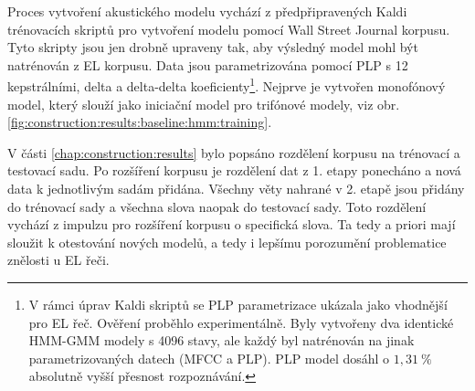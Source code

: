 
Proces vytvoření akustického modelu vychází z předpřipravených Kaldi trénovacích skriptů pro vytvoření modelu pomocí Wall Street Journal korpusu.
Tyto skripty jsou jen drobně upraveny tak, aby výsledný model mohl být natrénován z EL korpusu. Data jsou parametrizována pomocí PLP s 12 kepstrálními, delta a delta-delta koeficienty\footnote{V rámci úprav Kaldi skriptů se PLP parametrizace ukázala jako vhodnější pro EL řeč. Ověření proběhlo experimentálně. Byly vytvořeny dva identické HMM-GMM modely s 4096 stavy, ale každý byl natrénován na jinak parametrizovaných datech (MFCC a PLP). PLP model dosáhl o $1,31\ \%$ absolutně vyšší přesnost rozpoznávání.}. Nejprve je vytvořen monofónový model, který slouží jako iniciační model pro trifónové  modely, viz obr. \ref{fig:construction:results:baseline:hmm:training}.


V části \ref{chap:construction:results} bylo popsáno rozdělení korpusu na trénovací a testovací sadu.
Po rozšíření korpusu je rozdělení dat z 1. etapy ponecháno a nová data k jednotlivým sadám přidána.
Všechny věty nahrané v 2. etapě jsou přidány do trénovací sady a všechna slova naopak do testovací sady.
Toto rozdělení vychází z impulzu pro rozšíření korpusu o specifická slova.
Ta tedy a priori mají sloužit k otestování nových modelů, a tedy i lepšímu porozumění problematice znělosti u EL řeči.


